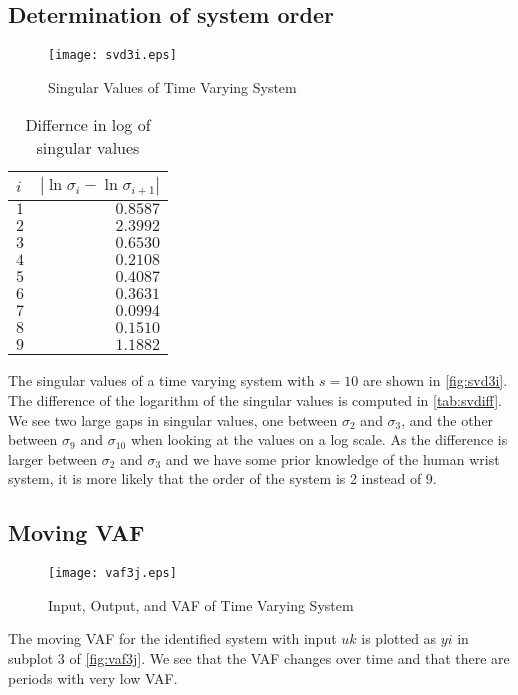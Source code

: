 \documentclass[11pt,a4paper]{article}
\begin{document}
\subsection{Determination of system order}
\begin{figure}
    \centering
    \texttt{[image: svd3i.eps]}
    \caption{Singular Values of Time Varying System}
    \label{fig:svd3i}
\end{figure}
\begin{table}
    \centering
    \begin{tabular}{|l|r|}
        \hline
        $i$ & $ |\ln \sigma_i - \ln \sigma_{i + 1}|$ \\
        \hline
        $ 1 $ & $ 0.8587 $ \\
        $ 2 $ & $ 2.3992 $ \\
        $ 3 $ & $ 0.6530 $ \\
        $ 4 $ & $ 0.2108 $ \\
        $ 5 $ & $ 0.4087 $ \\
        $ 6 $ & $ 0.3631 $ \\
        $ 7 $ & $ 0.0994 $ \\
        $ 8 $ & $ 0.1510 $ \\
        $ 9 $ & $ 1.1882 $ \\
        \hline
    \end{tabular}
    \caption{Differnce in log of singular values}
    \label{tab:svdiff}
\end{table}
The singular values of a time varying system with $s = 10$ are shown in
\autoref{fig:svd3i}. The difference of the logarithm of the singular values is
computed in \autoref{tab:svdiff}. We see two large gaps in singular values, one
between $\sigma_2$ and $\sigma_3$, and the other between $\sigma_9$ and
$\sigma_{10}$ when looking at the values on a log scale. As the difference is
larger between $\sigma_2$ and $\sigma_3$ and we have some prior knowledge of
the human wrist system, it is more likely that the order of the system is 2
instead of 9.

\subsection{Moving VAF}
\begin{figure}
    \centering
    \texttt{[image: vaf3j.eps]}
    \caption{Input, Output, and VAF of Time Varying System}
    \label{fig:vaf3j}
\end{figure}
The moving VAF for the identified system with input $uk$ is plotted as $yi$ in
subplot 3 of \autoref{fig:vaf3j}. We see that the VAF changes over time and
that there are periods with very low VAF.
\end{document}
